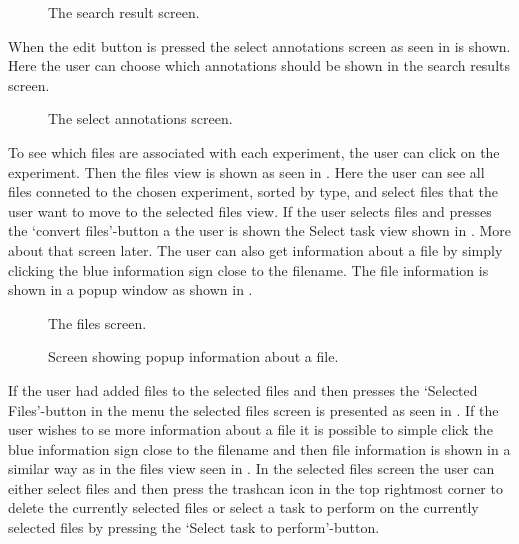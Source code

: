 \begin{figure}[ht]
\caption{The search result screen.}
\label{fig:ios_searchResult}
\end{figure}
\FloatBarrier
When the edit button is pressed the select annotations screen as seen in  is shown. Here the user can choose which annotations should be shown in the search results screen. 

\begin{figure}[htb]
\caption{The select annotations screen.}
\label{fig:ios_selectAnnotations}
\end{figure}
\FloatBarrier
To see which files are associated with each experiment, the user can click on the experiment. Then the files view is shown as seen in . Here the user can see all files conneted to the chosen experiment, sorted by type, and select files that the user want to move to the selected files view. If the user selects files and presses the ‘convert files’-button a the user is shown the Select task view shown in . More about that screen later. The user can also get information about a file by simply clicking the blue information sign close to the filename. The file information is shown in a popup window as shown in .

\begin{figure}[htb]
\caption{The files screen.}
\label{fig:ios_files1}
\end{figure}

\begin{figure}[htb]
\caption{Screen showing popup information about a file.}
\label{fig:ios_fileInfo}
\end{figure}
\FloatBarrier
If the user had added files to the selected files and then presses the ‘Selected Files’-button in the menu the selected files screen is presented as seen in . If the user wishes to se more information about a file it is possible to simple click the blue information sign close to the filename and then file information is shown in a similar way as in the files view seen in . In the selected files screen the user can either select files and then press the trashcan icon in the top rightmost corner to delete the currently selected files or select a task to perform on the currently selected files by pressing the ‘Select task to perform’-button. 

